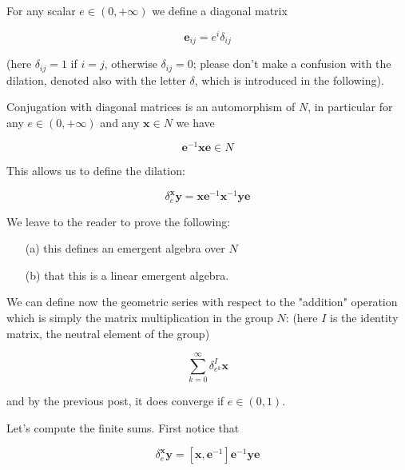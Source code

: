 \documentclass{article}
\begin{document}
For any scalar $e \in (0,+\infty)$ we define a diagonal matrix 



$$ \mathbf{e}_{ij} = e^{i} \delta_{ij}$$



(here $\delta_{ij} = 1$ if $i=j$, otherwise $\delta_{ij} = 0$; please don't make a confusion with the dilation, denoted also with the letter $\delta$, which is introduced in the following).



Conjugation with diagonal matrices is an automorphism of $N$, in particular for any $e \in (0,+\infty)$ and any $\mathbf{x} \in N$ we have 


$$ \mathbf{e}^{-1} \mathbf{x} \mathbf{e} \in N$$



This allows us to define the dilation: 







$$ \delta^{\mathbf{x}}_{e} \mathbf{y} = \mathbf{x} \mathbf{e}^{-1} \mathbf{x}^{-1} \mathbf{y} \mathbf{e}$$


We leave to the reader to prove the following:  
\begin{enumerate}
\item[(a)] this defines an emergent algebra over $N$

\item[(b)] that this is a linear emergent algebra.
\end{enumerate}






We can define now the geometric series with respect to the "addition" operation which is simply the matrix multiplication in the group $N$:  (here $I$ is the identity matrix, the neutral element of the group)







$$ \sum_{k=0}^{\infty} \delta_{e^{k}}^{I} \mathbf{x}$$



and by the previous post, it does converge if $e \in (0,1)$. 



Let's compute the finite sums. First notice that 



$$ \delta^{\mathbf{x}}_{e} \mathbf{y} = [\mathbf{x}, \mathbf{e}^{-1}]  \mathbf{e}^{-1} \mathbf{y} \mathbf{e}$$
\end{document}
